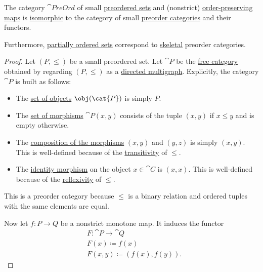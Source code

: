 \begin{theorem}\label{thm:order_category_isomorphism}
  The category \( \cat{PreOrd} \) of small \hyperref[def:preordered_set]{preordered sets} and (nonstrict) \hyperref[def:order_function/preserving]{order-preserving maps} is \hyperref[rem:category_similarity/isomorphism]{isomorphic} to the category of small \hyperref[def:preorder_category]{preorder categories} and their functors.

  Furthermore, \hyperref[def:partially_ordered_set]{partially ordered sets} correspond to \hyperref[def:skeletal_category]{skeletal} preorder categories.
\end{theorem}
\begin{proof}
   Let \( (P, \leq) \) be a small preordered set. Let \( \cat{P} \) be the \hyperref[def:directed_multigraph_free_category]{free category} obtained by regarding \( (P, \leq) \) as a \hyperref[def:directed_multigraph]{directed multigraph}. Explicitly, the category \( \cat{P} \) is built as follows:
  \begin{itemize}
    \item The \hyperref[def:category/objects]{set of objects} \( \obj(\cat{P}) \) is simply \( P \).

    \item The \hyperref[def:category/morphisms]{set of morphisms} \( \cat{P}(x, y) \) consists of the tuple \( (x, y) \) if \( x \leq y \) and is empty otherwise.

    \item The \hyperref[def:category/composition]{composition of the morphisms} \( (x, y) \) and \( (y, z) \) is simply \( (x, y) \). This is well-defined because of the \hyperref[def:binary_relation/transitive]{transitivity} of \( \leq \).

    \item The \hyperref[def:category/identity]{identity morphism} on the object \( x \in \cat{C} \) is \( (x, x) \). This is well-defined because of the \hyperref[def:binary_relation/reflexive]{reflexivity} of \( \leq \).
  \end{itemize}

  This is a preorder category because \( \leq \) is a binary relation and ordered tuples with the same elements are equal.

  Now let \( f: P \to Q \) be a nonstrict monotone map. It induces the functor
  \begin{equation*}
    \begin{aligned}
      &F: \cat{P} \to \cat{Q} \\
      &F(x) \coloneqq f(x) \\
      &F(x, y) \coloneqq (f(x), f(y)).
    \end{aligned}
  \end{equation*}


\end{proof}
